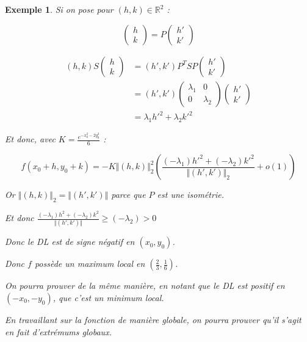\documentclass[a4paper,12pt]{book}
\newtheorem{Exe}{Exemple}[section]
\def\R{\mathbb{R}}
\begin{document}
\begin{Exe}
\par Si on pose pour $(h,k)\in\R^2$ :
\par $$\begin{pmatrix} h \\ k\end{pmatrix} = P\begin{pmatrix} h' \\ k'\end{pmatrix}$$
\par \begin{align*} (h,k)S\begin{pmatrix} h \\ k\end{pmatrix} &= (h', k')P^TSP\begin{pmatrix} h' \\ k'\end{pmatrix}\\
&= (h', k')\begin{pmatrix}\lambda_1 & 0 \\ 0 & \lambda_2 \end{pmatrix}\begin{pmatrix}h' \\ k'\end{pmatrix}\\
&= \lambda_1h'^2+\lambda_2k'^2
\end{align*}
\par Et donc, avec $K = \frac{e^{-x_0^2-2y_0^2}}{6}$ :
\par $$f(x_0+h, y_0+k) =-K\Vert (h,k)\Vert_2^2\left(\frac{(-\lambda_1)h'^2+(-\lambda_2)k'^2}{\Vert (h',k')\Vert_2}+o(1)\right)$$
\par Or $\Vert (h,k)\Vert_2 = \Vert(h', k')\Vert$ parce que $P$ est une isométrie.
\par Et donc $\frac{(-\lambda_1)h^2 + (-\lambda_2)k^2}{\Vert (h', k')\Vert}\geq (-\lambda_2)>0$
\par Donc le DL est de signe négatif en $(x_0, y_0)$.
\par Donc $f$ possède un maximum local en $\left(\frac{2}{3}, \frac{1}{6}\right)$.
\par On pourra prouver de la même manière, en notant que le DL est positif en $(-x_0, -y_0)$, que c'est un minimum local.
\par En travaillant sur la fonction de manière globale, on pourra prouver qu'il s'agit en fait d'extrémums globaux.
\end{Exe}
\end{document}
